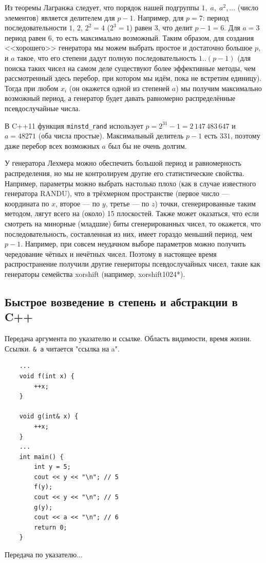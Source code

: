 \documentclass{book}
\begin{document}
Из теоремы Лагранжа следует, что порядок нашей подгруппы $1,\; a,\; a^2, ...$ (число элементов)
является делителем для $p - 1$. Например, для $p = 7$: период последовательности $1$, $2$, $2^2 =
4$ ($2^3 = 1$) равен $3$, что делит $p - 1 = 6$. Для $a = 3$ период равен $6$, то есть максимально
возможный.  Таким образом, для создания <<хорошего>> генератора мы можем выбрать простое и
достаточно большое $p$, и $a$ такое, что его степени дадут полную последовательность $1..(p - 1)$
(для поиска таких чисел на самом деле существуют более эффективные методы, чем рассмотренный здесь
перебор, при котором мы идём, пока не встретим единицу). Тогда при любом $x_i$ (он окажется одной
из степеней $a$) мы получим максимально возможный период, а генератор будет давать равномерно
распределённые псевдослучайные числа.

В C++11 функция \texttt{minstd_rand} использует $p = 2^{31} - 1 = 2\,147\,483\,647$ и $a =
48271$ (оба числа простые). Максимальный делитель $p - 1$ есть $331$, поэтому даже перебор всех
возможных $a$ был бы не очень долгим.

У генератора Лехмера можно обеспечить большой период и равномерность распределения, но мы не
контролируем другие его статистические свойства. Например, параметры
можно выбрать настолько плохо (как в случае известного генератора RANDU), что в трёхмерном пространстве (первое число --- координата
по $x$, второе --- по $y$, третье --- по $z$) точки, сгенерированные таким методом, лягут всего на (около) 15
плоскостей. Также может оказаться, что если смотреть на минорные (младшие) биты сгенерированных
чисел, то окажется, что последовательность, составленная из них, имеет гораздо меньший период, чем
$p - 1$. Например, при совсем неудачном выборе параметров можно получить чередование чётных и нечётных
чисел. Поэтому в настоящее время распространение получили другие генериторы псевдослучайных чисел,
такие
как генераторы семейства xorshift (например, xorshift1024*).

\subsection{Быстрое возведение в степень и абстракции в C++}

Передача аргумента по указателю и ссылке. Область видимости, время жизни.
Ссылки. \texttt{& a} читается "ссылка на a".
\begin{verbatim}
    ...
    void f(int x) {
        ++x; 
    }

    void g(int& x) {
        ++x; 
    }
    ... 
    int main() {
        int y = 5; 
        cout << y << "\n"; // 5 
        f(y); 
        cout << y << "\n"; // 5 
        g(y); 
        cout << a << "\n"; // 6
        return 0;
    }
\end{verbatim}
Передача по указателю...
\end{document}
